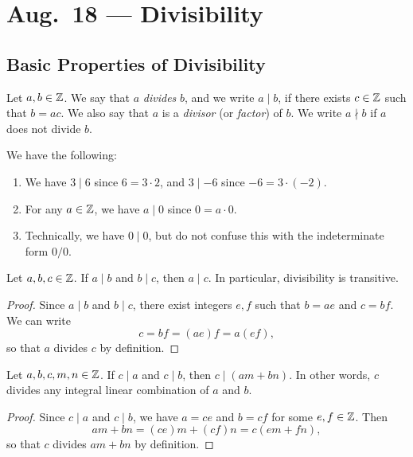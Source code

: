 \chapter{Aug.~18 --- Divisibility}

\section{Basic Properties of Divisibility}

\begin{definition}
  Let $a, b \in \mathbb{Z}$. We say that
  $a$ \emph{divides} $b$, and we write
  $a \mid b$, if there exists $c \in \mathbb{Z}$
  such that $b = ac$. We also say that
  $a$ is a \emph{divisor} (or \emph{factor})
  of $b$. We write
  $a \nmid b$ if $a$ does not divide $b$.
\end{definition}

\begin{example} We have the following:
  \begin{enumerate}
    \item We have $3 \mid 6$ since
      $6 = 3 \cdot 2$, and $3 \mid -6$ since
      $-6 = 3 \cdot (-2)$.
    \item For any $a \in \mathbb{Z}$, we have $a \mid 0$
      since $0 = a \cdot 0$.
    \item Technically, we have
      $0 \mid 0$, but do not confuse this
      with the indeterminate form $0 / 0$.
  \end{enumerate}
\end{example}

\begin{prop}
  Let $a, b, c \in \mathbb{Z}$. If $a \mid b$ and
  $b \mid c$, then $a \mid c$. In particular,
  divisibility is transitive.
\end{prop}

\begin{proof}
  Since $a \mid b$ and $b \mid c$, there
  exist integers $e, f$ such that
  $b = ae$ and $c = bf$. We can write
  \[
    c = bf = (ae)f = a(ef),
  \]
  so that $a$ divides $c$ by definition.
\end{proof}

\begin{prop}
  Let $a, b, c, m, n \in \mathbb{Z}$. If $c \mid a$
  and $c \mid b$, then $c \mid (am + bn)$. In
  other words, $c$ divides any integral
  linear combination of $a$ and $b$.
\end{prop}

\begin{proof}
  Since $c \mid a$ and $c \mid b$, we have
  $a = ce$ and $b = cf$ for some $e, f \in \mathbb{Z}$.
  Then
  \[
    am + bn = (ce)m + (cf)n
    = c(em + fn),
  \]
  so that $c$ divides $am + bn$ by definition.
\end{proof}

